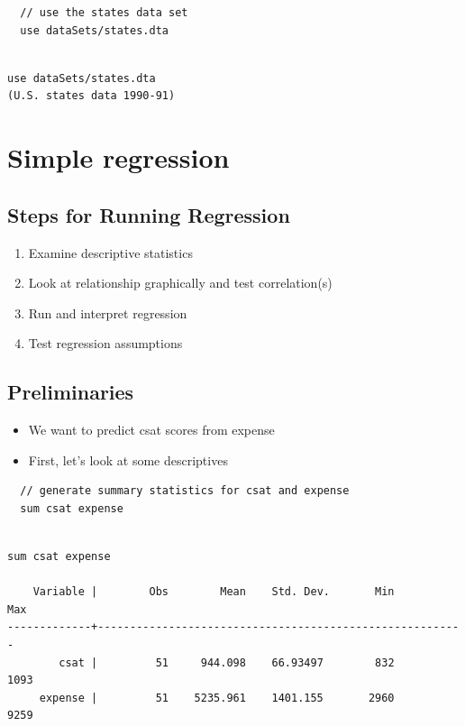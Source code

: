 \documentclass[]{book}
\providecommand{\tightlist}{%
  \setlength{\itemsep}{0pt}\setlength{\parskip}{0pt}}
\begin{document}
\begin{verbatim}
  // use the states data set
  use dataSets/states.dta
\end{verbatim}

\begin{verbatim}

use dataSets/states.dta
(U.S. states data 1990-91)
\end{verbatim}

\section{Simple regression}\label{simple-regression}

\subsection{Steps for Running
Regression}\label{steps-for-running-regression}

\begin{enumerate}
\def\labelenumi{\arabic{enumi}.}
\tightlist
\item
  Examine descriptive statistics
\item
  Look at relationship graphically and test correlation(s)
\item
  Run and interpret regression
\item
  Test regression assumptions
\end{enumerate}

\subsection{Preliminaries}\label{preliminaries}

\begin{itemize}
\tightlist
\item
  We want to predict csat scores from expense
\item
  First, let's look at some descriptives
\end{itemize}

\begin{verbatim}
  // generate summary statistics for csat and expense
  sum csat expense
\end{verbatim}

\begin{verbatim}

sum csat expense

    Variable |        Obs        Mean    Std. Dev.       Min        Max
-------------+---------------------------------------------------------
        csat |         51     944.098    66.93497        832       1093
     expense |         51    5235.961    1401.155       2960       9259
\end{verbatim}
\end{document}
